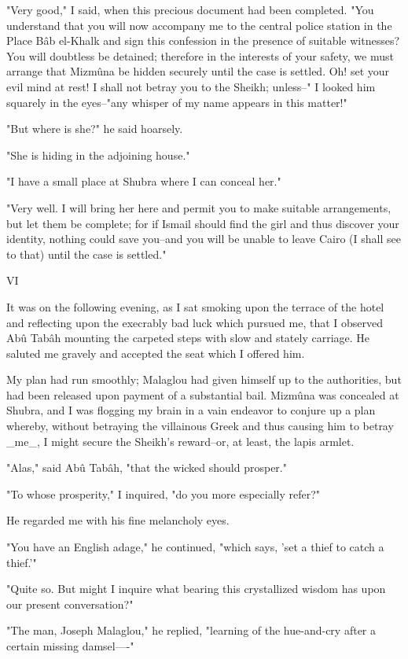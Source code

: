 "Very good," I said, when this precious document had been completed.
"You understand that you will now accompany me to the central police
station in the Place Bâb el-Khalk and sign this confession in the
presence of suitable witnesses? You will doubtless be detained;
therefore in the interests of your safety, we must arrange that
Mizmûna be hidden securely until the case is settled. Oh! set your
evil mind at rest! I shall not betray you to the Sheikh; unless--"
I looked him squarely in the eyes--"any whisper of my name appears
in this matter!"

"But where is she?" he said hoarsely.

"She is hiding in the adjoining house."

"I have a small place at Shubra where I can conceal her."

"Very well. I will bring her here and permit you to make suitable
arrangements, but let them be complete; for if Ismail should find the
girl and thus discover your identity, nothing could save you--and you
will be unable to leave Cairo (I shall see to that) until the case is
settled."


VI

It was on the following evening, as I sat smoking upon the terrace of
the hotel and reflecting upon the execrably bad luck which pursued me,
that I observed Abû Tabâh mounting the carpeted steps with slow and
stately carriage. He saluted me gravely and accepted the seat which I
offered him.

My plan had run smoothly; Malaglou had given himself up to the
authorities, but had been released upon payment of a substantial bail.
Mizmûna was concealed at Shubra, and I was flogging my brain in a vain
endeavor to conjure up a plan whereby, without betraying the
villainous Greek and thus causing him to betray _me_, I might secure
the Sheikh's reward--or, at least, the lapis armlet.

"Alas," said Abû Tabâh, "that the wicked should prosper."

"To whose prosperity," I inquired, "do you more especially refer?"

He regarded me with his fine melancholy eyes.

"You have an English adage," he continued, "which says, 'set a thief
to catch a thief.'"

"Quite so. But might I inquire what bearing this crystallized wisdom
has upon our present conversation?"

"The man, Joseph Malaglou," he replied, "learning of the hue-and-cry
after a certain missing damsel----"

